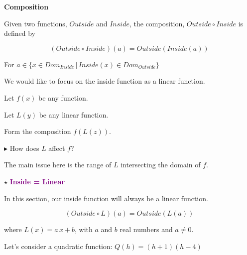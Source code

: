\documentclass{ximera}
\begin{document}
\begin{idea} \textbf{\textcolor{blue!55!black}{Composition}}  


Given two functions, $Outside$ and $Inside$, the composition, $Outside \circ Inside$ is defined by

\[      (Outside \circ Inside)(a) = Outside(Inside(a))        \]

For $ a \in \{  x \in Dom_{Inside} \, | \,    Inside(x) \in Dom_{Outside}  \}$

\end{idea}

We would like to focus on the inside function as a linear function.




Let $f(x)$ be any function. 

Let $L(y)$ be any linear function. 


Form the composition $f(L(z))$. 

$\blacktriangleright$ How does $L$ affect $f$?




The main issue here is the range of $L$ intersecting the domain of $f$. 











$\star$ \textbf{\textcolor{purple}{Inside = Linear}}


In this section, our inside function will always be a linear function.



\[      (Outside \circ L)(a) = Outside(L(a))        \]


where $L(x) = a \, x + b$, with $a$ and $b$ real numbers and $a \ne 0$.



Let's consider a quadratic function: $Q(h) = (h+1)(h-4)$
\end{document}
